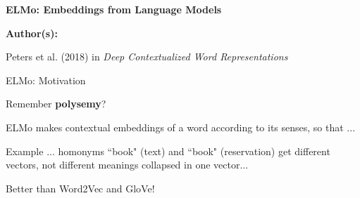 
\begin{frame}{}
    \begin{center}
        \large \textbf{ELMo: Embeddings from Language Models}
    \end{center}
    \vspace{20pt}
    
    \textbf{Author(s):}
    \begin{itemizeSpaced}{5pt}
    {\color{DimGrey} 
        \item Peters et al. (2018) in \emph{Deep Contextualized Word Representations}
        
    }
    \end{itemizeSpaced}
\end{frame}




\begin{frame}{ELMo: Motivation}
    \footnotesize  
    
    Remember \textbf{polysemy}? \newline 
    
    ELMo makes contextual embeddings of a word according to its senses, so that ...
    
    \begin{exampleBlock}{Example}
        ... homonyms ``book" (text) and ``book" (reservation) get different vectors, not different meanings collapsed in one vector...\newline 
        
        Better than Word2Vec and GloVe!
        
    \end{exampleBlock}
    
    
    
\end{frame}



